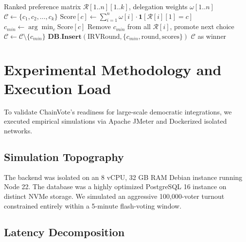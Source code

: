\documentclass[journal,10pt,twocolumn]{IEEEtran}
\begin{document}
\begin{algorithm}[H]
\caption{IRV Elimination Tally with Weight Propagation}
\begin{algorithmic}[1]
\REQUIRE Ranked preference matrix $\mathcal{R}[1..n][1..k]$, delegation weights $\omega[1..n]$
\STATE $\mathcal{C} \gets \{c_1, c_2, \ldots, c_k\}$
        \STATE $\mathrm{Score}[c] \gets \sum_{i=1}^{n} \omega[i] \cdot \mathbf{1}[\mathcal{R}[i][1] = c]$
    \ENDFOR
    \STATE $c_{min} \gets \arg\min_{c} \mathrm{Score}[c]$
    \STATE Remove $c_{min}$ from all $\mathcal{R}[i]$, promote next choice
    \STATE $\mathcal{C} \gets \mathcal{C} \setminus \{c_{min}\}$
    \STATE $\textbf{DB.Insert}(\text{IRVRound}, \{c_{min}, \mathrm{round}, \mathrm{scores}\})$
\ENDWHILE
\RETURN $\mathcal{C}$ as winner
\end{algorithmic}
\end{algorithm}

\section{Experimental Methodology and Execution Load}

To validate ChainVote's readiness for large-scale democratic integrations, we executed empirical simulations via Apache JMeter and Dockerized isolated networks.

\subsection{Simulation Topography}

The backend was isolated on an 8 vCPU, 32 GB RAM Debian instance running Node 22. The database was a highly optimized PostgreSQL 16 instance on distinct NVMe storage. We simulated an aggressive 100,000-voter turnout constrained entirely within a 5-minute flash-voting window.

\subsection{Latency Decomposition}
\end{document}
